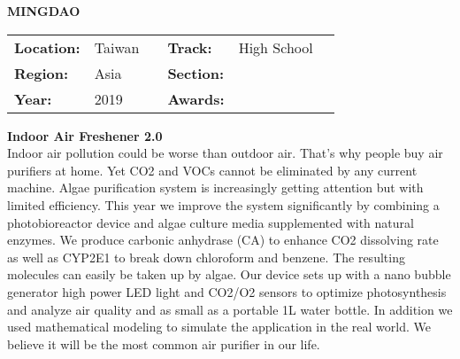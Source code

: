 \textbf{\uppercase{Mingdao}} \FloatBarrier \begin{table}[h] \begin{tabular}{lp{2.5cm}llll} \textbf{Location:} & Taiwan & \multicolumn{1}{|l}{} & \textbf{Track:}   & High School \\ \textbf{Region:}   & Asia   & \multicolumn{1}{|l}{} & \textbf{Section:} &  \\ \textbf{Year:}     & 2019   & \multicolumn{1}{|l}{} & \textbf{Awards:}  & \end{tabular} \end{table} \FloatBarrier \noindent\textbf{Indoor Air Freshener 2.0} \vspace{.2cm}\\ 
Indoor air pollution could be worse than outdoor air. That’s why people buy air purifiers at home. Yet CO2 and VOCs cannot be eliminated by any current machine. Algae purification system is increasingly getting attention but with limited efficiency. This year we improve the system significantly by combining a photobioreactor device and algae culture media supplemented with natural enzymes. We produce carbonic anhydrase (CA) to enhance CO2 dissolving rate as well as CYP2E1 to break down chloroform and benzene. The resulting molecules can easily be taken up by algae. Our device sets up with a nano bubble generator high power LED light and CO2/O2 sensors to optimize photosynthesis and analyze air quality and as small as a portable 1L water bottle.  In addition we used mathematical modeling to simulate the application in the real world. We believe it will be the most common air purifier in our life.     
\vspace{2cm}

